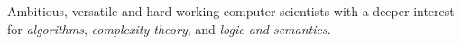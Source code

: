 Ambitious, versatile and hard-working computer scientists with a deeper interest
for \emph{algorithms}, \emph{complexity theory}, and \emph{logic and semantics}.
